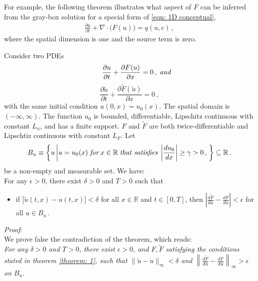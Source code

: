 For example, the following theorem illustrates what aspect of $F$ can be inferred from the gray-box
solution for a special form of \eqref{eqn: 1D conceptual},
\begin{equation*}\begin{split}
    \frac{\partial u}{\partial t}+ \nabla \cdot \big( F(u) \big) = q(u,c)\,,
\end{split}
\end{equation*}
where the spatial dimension is one and the source term is zero.
\begin{theorem}
    Consider two PDEs
    \begin{equation}
        \qquad\frac{\partial u}{\partial t} + \frac{\partial F(u)}{\partial x} = 0\,,\; \emph{and}
        \label{eqn: easy 1}
    \end{equation}
    \begin{equation}
        \frac{\partial \tilde{u}}{\partial t} + \frac{\partial \tilde{F}(\tilde{u})}{\partial x} = 0\,,
        \label{eqn: easy 2}
    \end{equation}
    with the same initial condition $u(0,x) = u_0(x)$. The spatial domain is $(-\infty, \infty)$. 
    The function $u_0$ is bounded, differentiable, 
    Lipschitz continuous with constant $L_u$, 
    and has a finite support. $F$ and $\tilde{F}$ are both twice-differentiable and Lipschtiz 
    continuous with constant $L_F$.
    Let 
    $$
    B_u \equiv \left\{ u\left| u=u_0(x) \; \emph{for}
    \; x \in \mathbb{R} \; \emph{that satisfies}\; \left|\frac{du_0}{dx}\right|\ge \gamma > 0
    \,,\right.
    \right\}
    \subseteq \mathbb{R}\,.
    $$
    be a non-empty and measurable set.
    We have:\\
    For any $\epsilon >0$, there exist $\delta>0$ and $T>0$ such that
    \begin{itemize}
        \item if $|\tilde{u}(t,x)-u(t,x)| < \delta$ for all $x\in \mathbb{R}$ and $t\in [0,T]$, then
              $\left|\frac{d\tilde{F}}{du} - \frac{dF}{du}\right| < 
               \epsilon $ for all $u\in B_u\,.$
    \end{itemize}
    \label{theorem: 1}
\end{theorem}

\emph{Proof}: \\
We prove false the contradiction of the theorem, which reads:\\
\emph{For any $\delta>0$ and $T>0$, there exist $\epsilon > 0$, and 
$F, \tilde{F}$ satisfying the conditions stated
in theorem \ref{theorem: 1}, such that $\|\tilde{u} - u\|_{\infty} < \delta$ and 
$\left\| \frac{d\tilde{F}}{du} - \frac{dF}{du} \right\|_\infty > \epsilon$ on $B_u$.}\\

